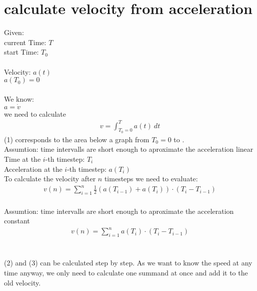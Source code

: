 \documentclass[11pt]{article} %
\begin{document}
\section{calculate velocity from acceleration}
Given:\\
current Time: $ T$\\
start Time: $T_0$\\\\
Velocity: $ a(t)$\\
$a(T_0) = 0$\\\\
We know:\\
$ a = \dot{v}$ \\
 we need to calculate \\
\begin{align}
v = \int_{T_0=0}^T a(t) ~dt
\end{align}
(1)  corresponds to the area below a graph from $T_0 = 0$ to .\\
Assumtion: time intervalls are short enough to aproximate the acceleration linear\\
Time at the $i$-th timestep: $T_i$\\
Acceleration at the $i$-th timestep: $a(T_i)$\\
To calculate the velocity after $n$ timesteps we need to evaluate:
\begin{align}
 v(n) = \sum_{i=1}^{n} \frac{1}{2} (a(T_{i-1})+ a(T_i)) \cdot (T_i - T_{i-1})
\end{align}\\
Assumtion: time intervalls are short enough to aproximate the acceleration constant
\begin{align}
 v(n) = \sum_{i=1}^{n} a(T_i) \cdot (T_i - T_{i-1})
\end{align}\\\\
(2) and (3) can be calculated step by step. As we want to know the speed at any time anyway, we only need to calculate one summand at once and add it to the old velocity.
\end{document}
